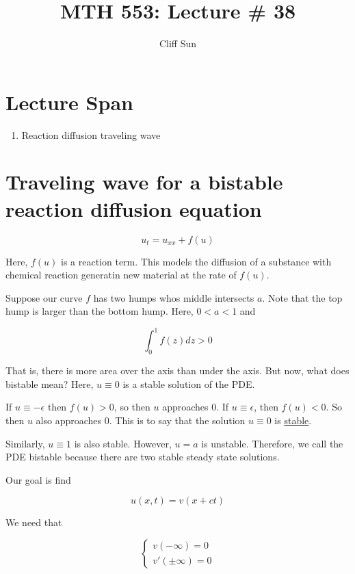 \documentclass{article}
\title{MTH 553: Lecture \# 38}
\author{Cliff Sun}
\newtheorem{one minute paper}[theorem]{One Minute Paper}
\begin{document}
\maketitle

\section*{Lecture Span}
\begin{enumerate}
    \item Reaction diffusion traveling wave
\end{enumerate}

\section*{Traveling wave for a bistable reaction diffusion equation}

\begin{equation}
    u_t = u_{xx} + f(u)
\end{equation}

Here, $f(u)$ is a reaction term. This models the diffusion of a substance with chemical reaction generatin new material at the rate of $f(u)$. 

Suppose our curve $f$ has two humps whos middle intersects $a$. Note that the top hump is larger than the bottom hump. Here, $0 < a < 1$ and 

\begin{equation}
    \int_{0}^{1}f(z)dz > 0
\end{equation}

That is, there is more area over the axis than under the axis. But now, what does bistable mean? Here, $u \equiv 0$ is a stable solution of the PDE. 

If $u \equiv -\epsilon$ then $f(u) > 0$, so then $u$ approaches $0$. If $u \equiv \epsilon$, then $f(u) < 0$. So then $u$ also approaches $0$. This is to say that the solution $u \equiv 0$ is \underline{stable}.

Similarly, $u\equiv 1$ is also stable. However, $u = a$ is unstable. Therefore, we call the PDE bistable because there are two stable steady state solutions. 

Our goal is find 

\begin{equation}
    u(x,t) = v(x + ct)
\end{equation}

We need that 

\begin{equation}
    \begin{cases}
        v(-\infty) = 0 \\
        v'(\pm\infty) = 0
    \end{cases}
\end{equation}
\end{document}

